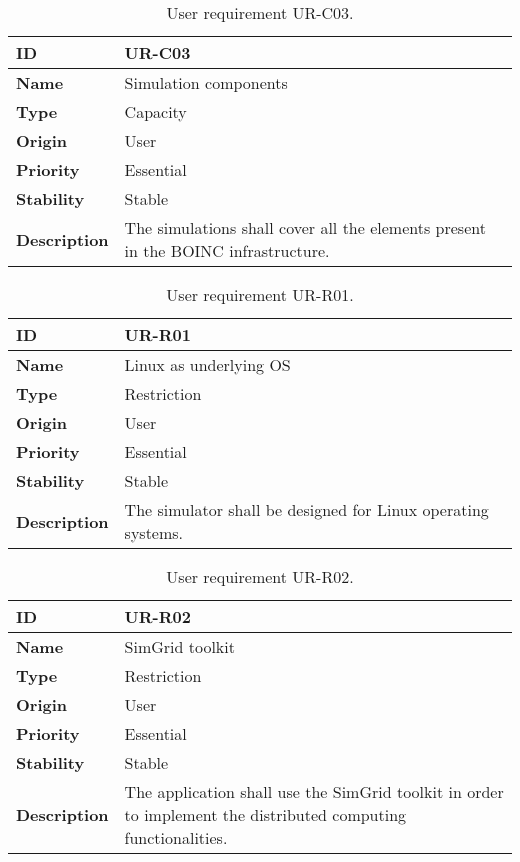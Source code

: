 \begin{center}
\begin{table*}[htbp]
\centering
\begin{tabular}{@{}p{2.5cm} p{9cm}@{}} 
\toprule
\textbf{ID} 				& UR-C03\\
\midrule
\textbf{Name} 			& Simulation components \\
\midrule
\textbf{Type} 			& Capacity \\
\midrule
\textbf{Origin} 			& User \\
\midrule
\textbf{Priority}		& Essential \\
\midrule
\textbf{Stability} 		& Stable \\
\midrule
\textbf{Description} 	& The simulations shall cover all the elements present in the BOINC infrastructure. \\
\bottomrule
\end{tabular}
\caption{User requirement UR-C03.}
\label{tab:urc03}
\end{table*}
\end{center}

\begin{center}
\begin{table*}[htbp]
\centering
\begin{tabular}{@{}p{2.5cm} p{9cm}@{}} 
\toprule
\textbf{ID} 				& UR-R01\\
\midrule
\textbf{Name} 			& Linux as underlying OS \\
\midrule
\textbf{Type} 			& Restriction \\
\midrule
\textbf{Origin} 			& User \\
\midrule
\textbf{Priority}		& Essential \\
\midrule
\textbf{Stability} 		& Stable \\
\midrule
\textbf{Description} 	& The simulator shall be designed for Linux operating systems. \\
\bottomrule
\end{tabular}
\caption{User requirement UR-R01.}
\label{tab:urr01}
\end{table*}
\end{center}

\begin{center}
\begin{table*}[htbp]
\centering
\begin{tabular}{@{}p{2.5cm} p{9cm}@{}} 
\toprule
\textbf{ID} 				& UR-R02\\
\midrule
\textbf{Name} 			& SimGrid toolkit \\
\midrule
\textbf{Type} 			& Restriction \\
\midrule
\textbf{Origin} 			& User \\
\midrule
\textbf{Priority}		& Essential \\
\midrule
\textbf{Stability} 		& Stable \\
\midrule
\textbf{Description} 	& The application shall use the SimGrid toolkit in order to implement the distributed computing functionalities. \\
\bottomrule
\end{tabular}
\caption{User requirement UR-R02.}
\label{tab:urr02}
\end{table*}
\end{center}


